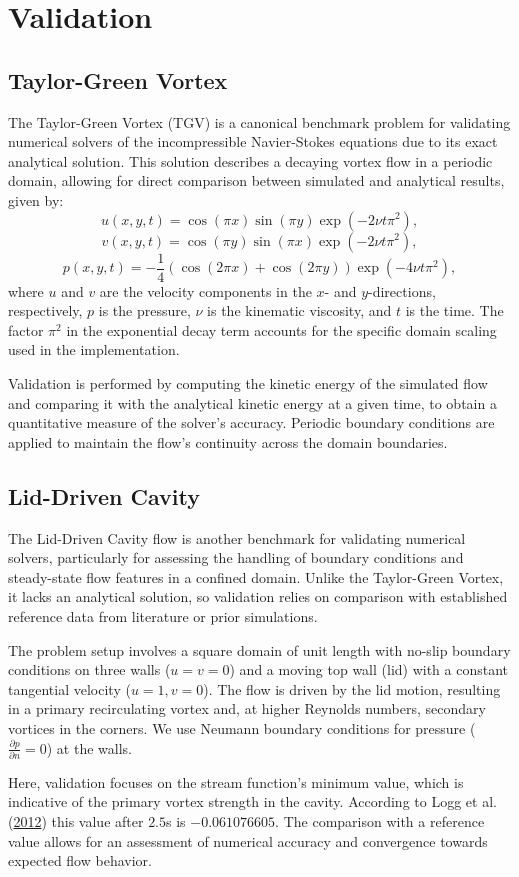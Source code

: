\section{Validation}

\subsection{Taylor-Green Vortex}
The Taylor-Green Vortex (TGV) is a canonical benchmark problem for validating numerical solvers of the incompressible Navier-Stokes equations due to its exact analytical solution.
This solution describes a decaying vortex flow in a periodic domain, allowing for direct comparison between simulated and analytical results, given by:
\[
u(x, y, t) = \cos(\pi x) \sin(\pi y) \exp(-2 \nu t \pi^2),
\]
\[
v(x, y, t) = \cos(\pi y) \sin(\pi x) \exp(-2 \nu t \pi^2),
\]
\[
p(x, y, t) = -\frac{1}{4} \left( \cos(2\pi x) + \cos(2\pi y) \right) \exp(-4 \nu t \pi^2),
\]
where \( u \) and \( v \) are the velocity components in the \( x \)- and \( y \)-directions, respectively, \( p \) is the pressure, \( \nu \) is the kinematic viscosity, and \( t \) is the time.
The factor \( \pi^2 \) in the exponential decay term accounts for the specific domain scaling used in the implementation.

Validation is performed by computing the kinetic energy of the simulated flow and comparing it with the analytical kinetic energy at a given time, to obtain a quantitative measure of the solver's accuracy.
Periodic boundary conditions are applied to maintain the flow's continuity across the domain boundaries.

\subsection{Lid-Driven Cavity}

The Lid-Driven Cavity flow is another benchmark for validating numerical solvers, particularly for assessing the handling of boundary conditions and steady-state flow features in a confined domain.
Unlike the Taylor-Green Vortex, it lacks an analytical solution, so validation relies on comparison with established reference data from literature or prior simulations.

The problem setup involves a square domain of unit length with no-slip boundary conditions on three walls (\( u = v = 0 \)) and a moving top wall (lid) with a constant tangential velocity (\( u = 1, v = 0 \)).
The flow is driven by the lid motion, resulting in a primary recirculating vortex and, at higher Reynolds numbers, secondary vortices in the corners.
We use Neumann boundary conditions for pressure (\( \frac{\partial p}{\partial n} = 0 \)) at the walls.

Here, validation focuses on the stream function's minimum value, which is indicative of the primary vortex strength in the cavity.
According to Logg et al. (\href{https://doi.org/10.1007/978-3-642-23099-8}{2012}) this value after $2.5$s is $-0.061076605$.
The comparison with a reference value allows for an assessment of numerical accuracy and convergence towards expected flow behavior.
